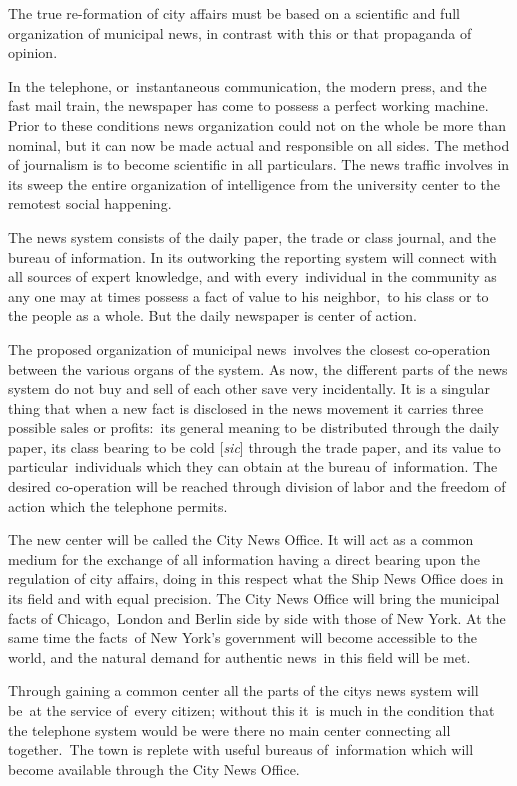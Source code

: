 \documentclass[openany,nobib]{tufte-book}
\begin{document}
\newpage The true re-formation of city affairs must be based on a scientific and
full organization of municipal news, in contrast with this or that
propaganda of opinion.~

In the telephone, or~instantaneous communication, the modern press, and
the fast mail train, the newspaper has come to possess a perfect working
machine. Prior to these conditions news organization could not on the
whole be more than nominal, but it can now be made actual and
responsible on all sides. The method of journalism is to become
scientific in all particulars. The news traffic involves in its sweep
the entire organization of intelligence from the university center to
the remotest social happening.~

The news system consists of the daily paper, the trade or class journal,
and the bureau of information. In its outworking the reporting system
will connect with all sources of expert knowledge, and with
every~individual in the community as any one may at times possess a fact
of value to his neighbor,~to his class or to the people as a whole. But
the daily newspaper is center of action.~

The proposed organization of municipal news~involves the closest
co-operation between the various organs of the system. As now, the
different parts of the news system do not buy and sell of each other
save very incidentally. It is a singular thing that when a new fact is
disclosed in the news movement it carries three possible sales or
profits:~its general meaning to be distributed through the daily paper,
its class bearing to be cold {[}\emph{sic}{]} through the trade paper,
and its value to particular~individuals which they can obtain at the
bureau of~information. The desired co-operation will be reached through
division of labor and the freedom of action which the telephone
permits.~

The new center will be called the City News Office. It will act as a
common medium for the exchange of all information having a direct
bearing upon the regulation of city affairs, doing in this respect what
the Ship News Office does in its field and with equal precision. The
City News Office will bring the municipal facts of Chicago,~London and
Berlin side by side with those of New York. At the same time the
facts~of New York's government will become accessible to the world, and
the natural demand for authentic news~in this field will be met.~

Through gaining a common center all the parts of the
city\textquotesingle s news system will be~at the service of~every
citizen; without this it~is much in the condition that the telephone
system would be were there no main center connecting all together.~The
town is replete with useful bureaus of~information which will become
available through the City News Office.~
\end{document}

